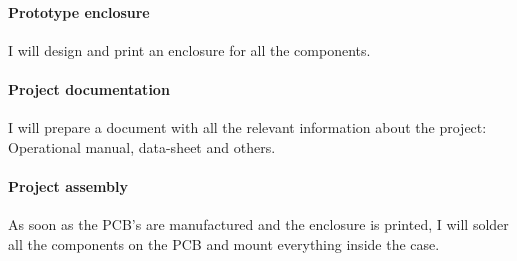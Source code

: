 \documentclass{article}
\begin{document}
\paragraph{Prototype enclosure}
I will design and print an enclosure for all the components.

\paragraph{Project documentation}
I will prepare a document with all the relevant information about the project: Operational manual, data-sheet and others.

\paragraph{Project assembly}
As soon as the PCB's are manufactured and the enclosure is printed, I will solder all the components on the PCB and mount everything inside the case.
\end{document}
